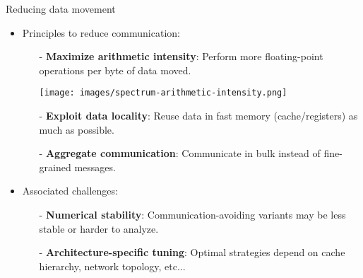 \documentclass[t,usepdftitle=false]{beamer}
\begin{document}
\begin{frame}{Reducing data movement}
\begin{itemize}
\item Principles to reduce communication:
\begin{itemize}
\item[-] \textbf{Maximize arithmetic intensity}: Perform more floating-point operations per byte of data moved.
\begin{center}\texttt{[image: images/spectrum-arithmetic-intensity.png]}\end{center}
\item[-] \textbf{Exploit data locality}: Reuse data in fast memory (cache/registers) as much as possible.
\item[-] \textbf{Aggregate communication}: Communicate in bulk instead of fine-grained messages.
\end{itemize}
\item Associated challenges:
\begin{itemize}
\item[-] \textbf{Numerical stability}: Communication-avoiding variants may be less stable or harder to analyze.
\item[-] \textbf{Architecture-specific tuning}: Optimal strategies depend on cache hierarchy, network topology, etc...
\end{itemize}
\end{itemize}
\end{frame}
\end{document}
